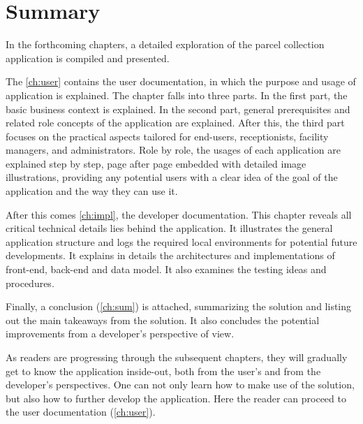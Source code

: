 \section{Summary}
\label{sec:IntroSum}

In the forthcoming chapters, a detailed exploration of the parcel collection application is compiled and presented. 

The \autoref{ch:user} contains the user documentation, in which the purpose and usage of application is explained. The chapter falls into three parts. In the first part, the basic business context is explained. In the second part, general prerequisites and related role concepts of the application are explained. After this, the third part focuses on the practical aspects tailored for end-users, receptionists, facility managers, and administrators. Role by role, the usages of each application are explained step by step, page after page embedded with detailed image illustrations, providing any potential users with a clear idea of the goal of the application and the way they can use it. 

After this comes \autoref{ch:impl}, the developer documentation. This chapter reveals all critical technical details lies behind the application. It illustrates the general application structure and logs the required local environments for potential future developments. It explains in details the architectures and implementations of front-end, back-end and data model. It also examines the testing ideas and procedures. 

Finally, a conclusion (\autoref{ch:sum}) is attached, summarizing the solution and listing out the main takeaways from the solution. It also concludes the potential improvements from a developer's perspective of view.

As readers are progressing through the subsequent chapters, they will gradually get to know the application inside-out, both from the user's and from the developer's perspectives. One can not only learn how to make use of the solution, but also how to further develop the application.
Here the reader can proceed to the user documentation (\autoref{ch:user}).



